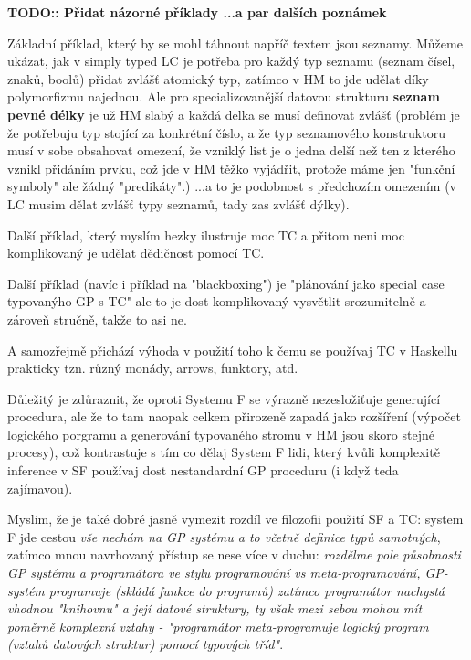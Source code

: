 \documentclass[11pt]{article}
\newcommand{\red}[1]{{\color{red} #1}}
\begin{document}
\begin{article}

\red{\textbf{TODO:: Přidat názorné příklady ...a par dalších poznámek}

Základní příklad, který by se mohl táhnout napříč textem jsou seznamy. Můžeme ukázat, jak v simply typed LC je potřeba pro každý typ seznamu (seznam čísel, znaků, boolů) přidat zvlášť atomický typ, zatímco v HM to jde udělat díky polymorfizmu najednou. Ale pro specializovanější datovou strukturu \textbf{seznam pevné délky} je už HM slabý a každá delka se musí definovat zvlášť (problém je že potřebuju typ stojící za konkrétní číslo, a že typ seznamového konstruktoru musí v sobe obsahovat omezení, že vzniklý list je o jedna delší než ten z kterého vznikl přidáním prvku, což jde v HM těžko vyjádřit, protože máme jen "funkční symboly" ale žádný "predikáty".) ...a to je podobnost s předchozím omezením (v LC musim dělat zvlášť typy seznamů, tady zas zvlášť dýlky). 

Další příklad, který myslím hezky ilustruje moc TC a přitom neni moc komplikovaný je udělat dědičnost pomocí TC.

Další příklad (navíc i příklad na "blackboxing") je "plánování jako special case typovanýho GP s TC" ale to je dost komplikovaný vysvětlit srozumitelně a zároveň stručně, takže to asi ne.

A samozřejmě přichází výhoda v použití toho k čemu se používaj TC v Haskellu prakticky tzn. různý monády, arrows, funktory, atd. 

Důležitý je zdůraznit, že oproti Systemu F se výrazně nezesložiťuje generující procedura, ale že to tam naopak celkem přirozeně zapadá jako rozšíření (výpočet logického porgramu a generování typovaného stromu v HM jsou skoro stejné procesy), což kontrastuje s tím co dělaj System F lidi, který kvůli komplexitě inference v SF používaj dost nestandardní GP proceduru (i když teda zajímavou). 

Myslim, že je také dobré jasně vymezit rozdíl ve filozofii použití SF a TC: system F jde cestou \textit{vše nechám na GP systému a to včetně definice typů samotných}, zatímco mnou navrhovaný přístup se nese více v duchu: \textit{rozdělme pole působnosti GP systému a programátora ve stylu programování vs meta-programování, GP-systém programuje (skládá funkce do programů) zatímco programátor nachystá vhodnou "knihovnu" a její datové struktury, ty však mezi sebou mohou mít poměrně komplexní vztahy - "programátor meta-programuje logický program (vztahů datových struktur) pomocí typových tříd"}.
}


\end{article}
\end{document}
